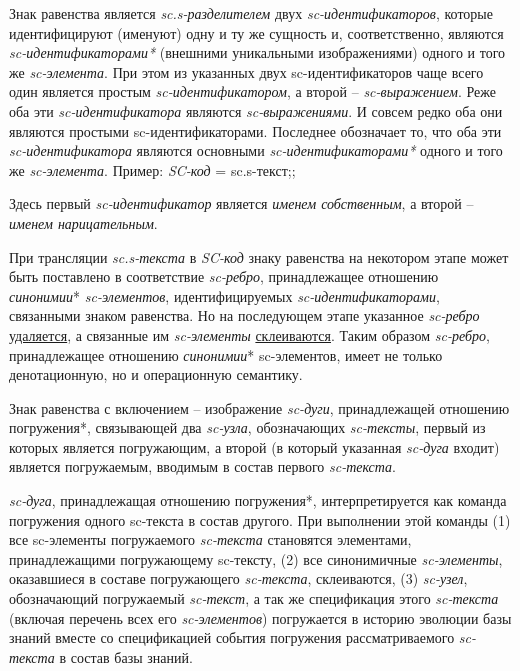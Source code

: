 Знак равенства является \textit{sc.s-разделителем} двух \textit{sc-идентификаторов}, которые идентифицируют (именуют) одну и ту же сущность и, соответственно, являются \textit{sc-идентификаторами*} (внешними уникальными изображениями) одного и того же \textit{sc-элемента}. При этом из указанных двух sc-идентификаторов чаще всего один является простым \textit{sc-идентификатором}, а второй -- \textit{sc-выражением}. Реже оба эти \textit{sc-идентификатора} являются \textit{sc-выражениями}. И совсем редко оба они являются простыми sc-идентификаторами. Последнее обозначает то, что оба эти \textit{sc-идентификатора} являются основными \textit{sc-идентификаторами*} одного и того же \textit{sc-элемента}. Пример:
\textit{SC-код} = sc.s-текст;;

Здесь первый \textit{sc-идентификатор} является \textit{именем собственным}, а второй -- \textit{именем нарицательным}.

При трансляции \textit{sc.s-текста} в \textit{SC-код} знаку равенства на некотором этапе может быть поставлено в соответствие \textit{sc-ребро}, принадлежащее отношению \textit{синонимии}* \textit{sc-элементов}, идентифицируемых \mbox{\textit{sc-идентификаторами}}, связанными знаком равенства. Но на последующем этапе указанное \textit{sc-ребро} \uline{удаляется}, а связанные им \textit{sc-элементы} \uline{склеиваются}. Таким образом \textit{sc-ребро}, принадлежащее отношению \textit{синонимии}* sc-элементов, имеет не только денотационную, но и операционную семантику.

Знак равенства с включением -- изображение \textit{sc-дуги}, принадлежащей отношению погружения*, связывающей два \textit{sc-узла}, обозначающих \textit{sc-тексты}, первый из которых является погружающим, а второй (в который указанная \textit{sc-дуга} входит) является погружаемым, вводимым в состав первого \textit{sc-текста}. 

\textit{sc-дуга}, принадлежащая отношению погружения*, интерпретируется как команда погружения одного sc-текста в состав другого. При выполнении этой команды (1) все sc-элементы погружаемого \textit{sc-текста} становятся элементами, принадлежащими погружающему sc-тексту, (2) все синонимичные \textit{sc-элементы}, оказавшиеся в составе погружающего \textit{sc-текста}, склеиваются, (3) \textit{sc-узел}, обозначающий погружаемый \textit{sc-текст}, а так же спецификация этого \textit{sc-текста} (включая перечень всех его \textit{sc-элементов}) погружается в историю эволюции базы знаний вместе со спецификацией события погружения рассматриваемого \textit{sc-текста} в состав базы знаний.


